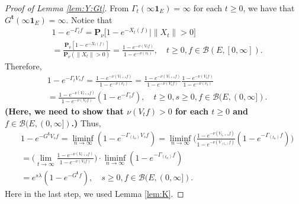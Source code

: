 \documentclass[12pt,a4paper]{amsart}
\numberwithin{equation}{section}
\theoremstyle{plain}
\theoremstyle{definition}
\begin{document}
\begin{proof}[Proof of Lemma \ref{lem:Y:Gt}]
  From $\Gamma_t(\infty \mathbf 1_E) = \infty$ for each $t\geq 0$, we have that $G^{\mathbf t}(\infty \mathbf 1_E) = \infty$.
  Notice that
  \begin{align}
    \label{eq:Y:Gt:1}
    & 1 - e^{- \Gamma_t f} 
    = \mathbf P_\nu \big[ 1 - e^{-X_t(f)} \big| \|X_t\|> 0\big] \\
    & = \frac{ \mathbf P_\nu [ 1 - e^{- X_t(f)}]}{ \mathbf P_\nu (\|X_t\| > 0)}
    = \frac{ 1 - e^{- \nu(V_tf)} }{ 1 - e^{- \nu(v_t)}},
    \quad t \geq 0, f \in \mathcal B(E,[0,\infty]).
  \end{align}
  Therefore,
  \begin{align}
    & 1 - e^{- \Gamma_t V_s f}
      = \frac{ 1 - e^{- \nu(V_{t+s} f)} }{ 1 - e^{- \nu(v_t)}}
     = \frac{ 1 - e^{- \nu(V_{t+s} f)} }{ 1 - e^{- \nu(V_tf)}} \frac{ 1 - e^{ - \nu(V_tf)}}{ 1 - e^{- \nu(v_t)}} \\
    & = \frac{ 1 - e^{- \nu(V_{t+s} f)} }{ 1 - e^{- \nu(V_tf)}} ( 1 - e^{- \Gamma_t f})
      , \quad t\geq 0, s \geq 0, f\in \mathcal B(E, (0,\infty]).
  \end{align}
{\bf (Here, we need to show that $\nu(V_tf) > 0$ for each $t\geq 0$ and $f\in \mathcal B(E,(0,\infty])$.)}
  Thus,
  \begin{align}
    & 1 - e^{- G^{\mathbf t} V_s f}
      = \liminf_{n\to \infty} ( 1 - e^{- \Gamma_{(t_n)} V_s f})
      = \liminf_{n\to \infty} \Big(  \frac{ 1 - e^{- \nu(V_{t_n+s}f)}}{ 1 - e^{- \nu(V_{(t_n)}f)}} (1 - e^{- \Gamma_{(t_n)} f}) \Big) \\
    & = \Big( \lim_{t \to \infty}   \frac{ 1 - e^{- \nu(V_{t+s}f)}}{ 1 - e^{- \nu(V_{t}f)}} \Big) \cdot \liminf_{n\to \infty} (1 - e^{- \Gamma_{(t_n)} f} ) \\
    &  = e^{s\lambda} (1 - e^{- G^{\mathbf t}f})
      , \quad s\geq 0, f\in \mathcal B(E,(0,\infty]).
  \end{align}
  Here in the last step, we used Lemma \ref{lem:K}.


\end{proof}
\end{document}
